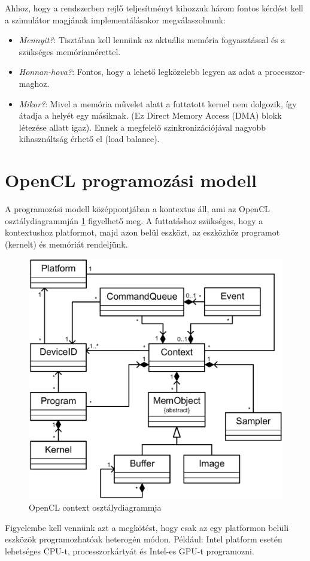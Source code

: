 	Ahhoz, hogy a rendszerben rejlő teljesítményt kihozzuk három fontos kérdést
	kell a szimulátor magjának implementálásakor megválaszolnunk:
	\begin{itemize}
		\item \emph{Mennyit?}: Tisztában kell lennünk az aktuális
		memória fogyasztással és a szükséges memóriamérettel.
		\item \emph{Honnan-hova?}: Fontos, hogy a lehető legközelebb legyen az adat
		a processzor-maghoz.
		\item \emph{Mikor?}: Mivel a memória művelet alatt a futtatott kernel nem
		dolgozik, így átadja a helyét egy másiknak. (Ez Direct Memory Access (DMA)
		blokk létezése allatt igaz). Ennek a megfelelő szinkronizációjával nagyobb
		kihasználtság érhető el (load balance).
	\end{itemize}
	
	
\section{OpenCL programozási modell}
	
	A programozási modell középpontjában a kontextus áll, ami az OpenCL
	osztálydiagrammján \ref{fig:class} figyelhető meg.
	A futtatáshoz szükséges, hogy a kontextushoz platformot, majd azon belül
	eszközt, az eszközhöz programot (kernelt) és memóriát rendeljünk.
	\begin{figure}[!h]
		\centering
		\includegraphics[width=0.6\columnwidth]{figures/eps/context.eps}
		\caption{OpenCL context osztálydiagrammja \cite{opencl}} 
		\label{fig:class} 
	\end{figure}
	Figyelembe kell vennünk azt a megkötést, hogy csak az egy platformon belüli
	eszközök programozhatóak heterogén módon. Például: Intel platform esetén
	lehetséges CPU-t, processzorkártyát és Intel-es GPU-t programozni.
	
